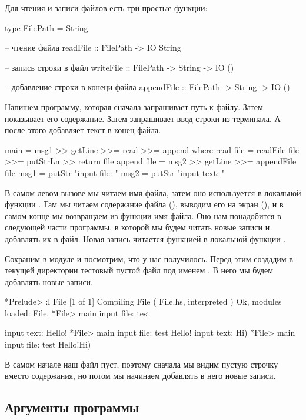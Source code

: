 Для чтения и записи файлов есть три простые функции:

\begin{code}
type FilePath = String

-- чтение файла
readFile    :: FilePath -> IO String

-- запись строки в файл
writeFile   :: FilePath -> String -> IO ()

-- добавление строки в конеци файла
appendFile  :: FilePath -> String -> IO ()
\end{code}

Напишем программу, которая сначала запрашивает путь к файлу.
Затем показывает его содержание. Затем запрашивает ввод строки
из терминала. А после этого добавляет текст в конец файла.

\begin{code}
main = msg1 >> getLine >>= read >>= append
    where read   file = readFile file >>= putStrLn >> return file
          append file = msg2 >> getLine >>= appendFile file
          msg1        = putStr "input file: "
          msg2        = putStr "input text: "
\end{code}

В самом левом вызове  мы читаем имя файла, затем
оно используется в локальной функции . Там мы читаем
содержание файла (), выводим его на экран (),
и в самом конце мы возвращаем из функции имя файла. Оно нам понадобится
в следующей части программы, в которой мы будем читать новые записи
и добавлять их в файл. Новая запись читается функцией 
в локальной функции .

Сохраним в модуле  и посмотрим, что у нас получилось.
Перед этим создадим в текущей директории тестовый
пустой файл под именем . В него мы будем добавлять новые
записи. 

\begin{code}
*Prelude> :l File
[1 of 1] Compiling File             ( File.hs, interpreted )
Ok, modules loaded: File.
*File> main
input file: test

input text: Hello!
*File> main
input file: test
Hello!
input text: Hi)
*File> main
input file: test
Hello!Hi)
\end{code}

В самом начале наш файл пуст, поэтому сначала мы видим
пустую строчку вместо содержания, но потом мы начинаем добавлять
в него новые записи.

\subsection{Аргументы программы}

